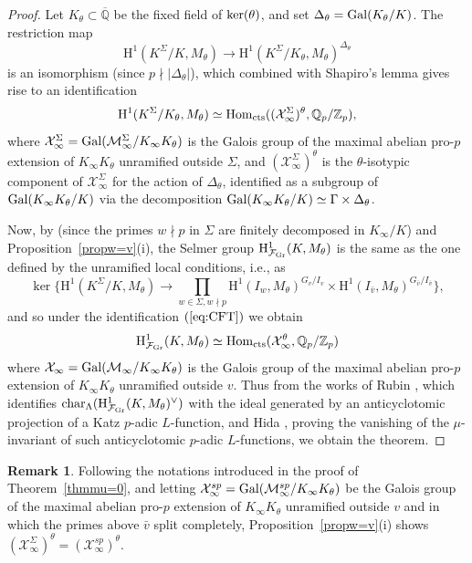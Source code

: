 \documentclass[10pt]{amsart}
\numberwithin{equation}{section}
\theoremstyle{definition}
\newtheorem{remark}[theorem]{Remark}
\theoremstyle{remark}
\newcommand{\Fcal}{\mathcal{F}}
\newcommand{\bZ}{\mathbb{Z}}
\newcommand{\bQ}{\mathbb{Q}}
\newcommand{\rH}{\mathrm{H}}
\begin{document}
\begin{proof}
Let $K_\theta\subset\overline{\bQ}$ be the fixed field of ${\rm ker}(\theta)$, and set $\Delta_\theta={\rm Gal}(K_\theta/K)$. The restriction map
\[
\rH^1(K^\Sigma/K,M_\theta)\rightarrow\rH^1(K^\Sigma/K_\theta,M_\theta)^{\Delta_\theta}
\] 
is an isomorphism (since $p\nmid\vert\Delta_\theta\vert$), which combined with Shapiro's lemma gives rise to an identification
\begin{equation}\label{eq:CFT}
\rH^1(K^\Sigma/K_\theta,M_\theta)
\simeq{\rm Hom}_{\rm cts}((\mathcal{X}_\infty^\Sigma)^\theta,\bQ_p/\bZ_p),
\end{equation}
where $\mathcal{X}_\infty^\Sigma={\rm Gal}(\mathcal{M}_\infty^\Sigma/K_\infty K_\theta)$ is the Galois group of the maximal abelian pro-$p$ extension of $K_\infty K_\theta$ unramified outside $\Sigma$, and $(\mathcal{X}_\infty^\Sigma)^\theta$ is the $\theta$-isotypic component of $\mathcal{X}_\infty^\Sigma$ for the action of $\Delta_\theta$, identified as a subgroup of ${\rm Gal}(K_\infty K_\theta/K)$ via the decomposition ${\rm Gal}(K_\infty K_\theta/K)\simeq\Gamma\times\Delta_\theta$. 

Now, by \cite[Rem.~3.2]{pollack2011anticyclotomic} (since the primes $w\nmid p$ in $\Sigma$ are finitely decomposed in $K_\infty/K$) and Proposition~\ref{propw=v}(i), the Selmer group $\rH^1_{\Fcal_{\rm Gr}}(K,M_\theta)$ is the same as the one defined by the unramified local conditions, i.e., as
\[
\ker\biggr\{\rH^1(K^\Sigma/K,M_\theta)\rightarrow\prod_{w \in \Sigma, w \nmid p}\rH^1(I_w,M_\theta)^{G_v/I_v}\times\rH^1(I_{\bar{v}},M_\theta)^{G_{\bar{v}}/I_{\bar{v}}}\biggr\},
\]
and so under the identification $(\ref{eq:CFT})$ we obtain
\[
\rH^1_{\Fcal_{\rm Gr}}(K,M_\theta)\simeq{\rm Hom}_{\rm cts}(\mathcal{X}_\infty^\theta,\bQ_p/\bZ_p)
\] 
where $\mathcal{X}_\infty={\rm Gal}(\mathcal{M}_\infty/K_\infty K_\theta)$ is the Galois group of the maximal abelian pro-$p$ extension of $K_\infty K_\theta$ unramified outside $v$. Thus from the works of  Rubin \cite{rubinmainconj},
which identifies $\mathrm{char}_\Lambda(\rH^1_{\Fcal_{\rm Gr}}(K,M_\theta)^\vee)$ with the ideal generated by an anticyclotomic projection of a Katz $p$-adic $L$-function,  
and Hida \cite{hidamu=0}, proving the vanishing of the $\mu$-invariant of such anticyclotomic $p$-adic $L$-functions, we obtain the theorem.
\end{proof}

\begin{remark}
Following the notations introduced in the proof of Theorem~\ref{thmmu=0}, and letting $\mathcal{X}_\infty^{sp}={\rm Gal}(\mathcal{M}_\infty^{sp}/K_\infty K_\theta)$ be the Galois group of the maximal abelian pro-$p$ extension of $K_\infty K_\theta$ unramified outside $v$ and in which the primes above $\bar{v}$ split completely, Proposition~\ref{propw=v}(i) shows $(\mathcal{X}_\infty^\Sigma)^\theta=(\mathcal{X}_\infty^{sp})^\theta$. 
\end{remark}
\end{document}
